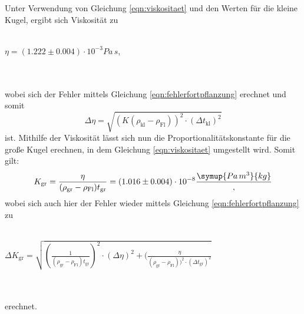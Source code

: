 Unter Verwendung von Gleichung \eqref{eqn:viskositaet} und den Werten für die kleine Kugel, ergibt sich Viskosität zu
\\ \\
\centerline{$\eta = (1.222 \pm 0.004) \cdot 10^{-3} Pa \, s$,}
\\ \\
wobei sich der Fehler mittels Gleichung \eqref{eqn:fehlerfortpflanzung} erechnet und somit
\begin{equation}
\Delta \eta = \sqrt{(K(\rho_\text{kl} - \rho_\text{Fl}))^2 \cdot (\Delta t_\text{kl})^2}
\end{equation}
ist.
Mithilfe der Viskosität lässt sich nun die Proportionalitätskonstante für die große Kugel erechnen, in dem Gleichung \eqref{eqn:viskositaet}
umgestellt wird.
Somit gilt:
\begin{equation}
K_\text{gr} = \frac{\eta}{(\rho_\text{gr} - \rho_\text{Fl})t_\text{gr}} = (1.016 \pm 0.004) \cdot 10^{-8} \frac{\symup{Pa \, m^3}{kg}},
\end{equation}
wobei sich auch hier der Fehler wieder mittels Gleichung \eqref{eqn:fehlerfortpflanzung} zu 
\\ \\
\centerline{$\Delta K_\text{gr} = \sqrt{(\frac{1}{(\rho_\text{gr} - \rho_\text{Fl})t_\text{gr}})^2 \cdot (\Delta \eta)^2 + ( \frac{\eta}{(\rho_\text{gr} - \rho_\text{Fl}))^2 \cdot (\Delta t_\text{gr})^2 } } $}
\\ \\
erechnet.

 

